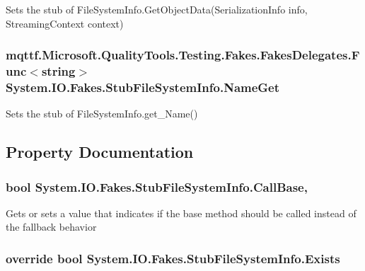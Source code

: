 Sets the stub of File\-System\-Info.\-Get\-Object\-Data(\-Serialization\-Info info, Streaming\-Context context)

\hypertarget{class_system_1_1_i_o_1_1_fakes_1_1_stub_file_system_info_a6cd475445a9b52567790b7f28240c3ea}{
\subsubsection[{Name\-Get}]{\setlength{\rightskip}{0pt plus 5cm}mqttf.\-Microsoft.\-Quality\-Tools.\-Testing.\-Fakes.\-Fakes\-Delegates.\-Func$<$string$>$ System.\-I\-O.\-Fakes.\-Stub\-File\-System\-Info.\-Name\-Get}}\label{class_system_1_1_i_o_1_1_fakes_1_1_stub_file_system_info_a6cd475445a9b52567790b7f28240c3ea}


Sets the stub of File\-System\-Info.\-get\-\_\-\-Name()



\subsection{Property Documentation}
\hypertarget{class_system_1_1_i_o_1_1_fakes_1_1_stub_file_system_info_a1b5be30d19d4af8029928256a4603d3f}{
\subsubsection[{Call\-Base}]{\setlength{\rightskip}{0pt plus 5cm}bool System.\-I\-O.\-Fakes.\-Stub\-File\-System\-Info.\-Call\-Base\hspace{0.3cm}{\ttfamily [get]}, {\ttfamily [set]}}}\label{class_system_1_1_i_o_1_1_fakes_1_1_stub_file_system_info_a1b5be30d19d4af8029928256a4603d3f}


Gets or sets a value that indicates if the base method should be called instead of the fallback behavior

\hypertarget{class_system_1_1_i_o_1_1_fakes_1_1_stub_file_system_info_a13a2c85c66252fb914827f4e82abc694}{
\subsubsection[{Exists}]{\setlength{\rightskip}{0pt plus 5cm}override bool System.\-I\-O.\-Fakes.\-Stub\-File\-System\-Info.\-Exists\hspace{0.3cm}{\ttfamily [get]}}}\label{class_system_1_1_i_o_1_1_fakes_1_1_stub_file_system_info_a13a2c85c66252fb914827f4e82abc694}


